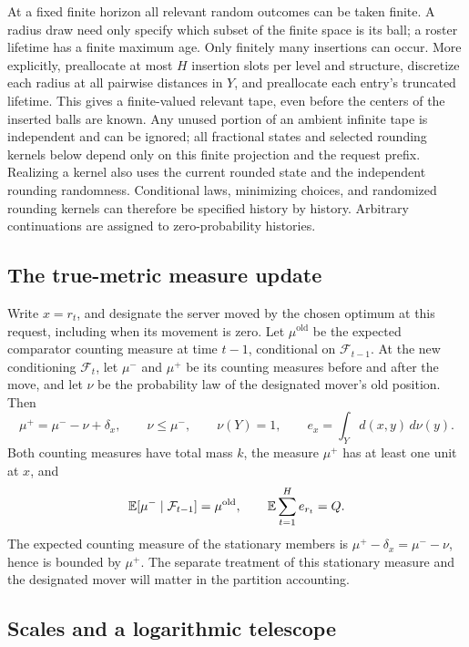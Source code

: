 At a fixed finite horizon all relevant random outcomes can be taken
finite. A radius draw need only specify which subset of the finite
space is its ball; a roster lifetime has a finite maximum age.
Only finitely many insertions can occur. More explicitly, preallocate
at most \(H\) insertion slots per level and structure, discretize each radius
at all pairwise distances in \(Y\), and preallocate each entry's
truncated lifetime. This gives a finite-valued relevant tape, even
before the centers of the inserted balls are known. Any unused
portion of an ambient infinite tape is independent and can be ignored;
all fractional states and selected rounding kernels below depend only
on this finite projection and the request prefix. Realizing a kernel
also uses the current rounded state and the independent rounding
randomness. Conditional laws, minimizing choices, and randomized rounding
kernels can therefore be specified
history by history. Arbitrary continuations are assigned to
zero-probability histories.

\subsection{The true-metric measure update}

Write \(x=r_t\), and designate the server moved by the chosen optimum
at this request, including when its movement is zero. Let
\(\mu^{\mathrm{old}}\) be the expected comparator counting measure
at time \(t-1\), conditional on \(\mathcal F_{t-1}\). At the new
conditioning \(\mathcal F_t\), let \(\mu^-\) and \(\mu^+\) be its
counting measures before and after the move, and let \(\nu\) be the
probability law of the designated mover's old position. Then
\begin{equation}\label{eq:measure-update}
 \mu^+=\mu^--\nu+\delta_x,\qquad
 \nu\le\mu^-,\qquad \nu(Y)=1,\qquad
 e_x=\int_Y d(x,y)\,d\nu(y).
\end{equation}
Both counting measures have total mass \(k\), the measure \(\mu^+\)
has at least one unit at \(x\), and
\[
 \mathbb E[\mu^-\mid\mathcal F_{t-1}]=\mu^{\mathrm{old}},
 \qquad
 \mathbb E\sum_{t=1}^H e_{r_t}=Q.
\]
The expected counting measure of the stationary members is
\(\mu^+-\delta_x=\mu^--\nu\), hence is bounded by \(\mu^+\).
The separate treatment of this stationary measure and the designated
mover will matter in the partition accounting.

\subsection{Scales and a logarithmic telescope}

